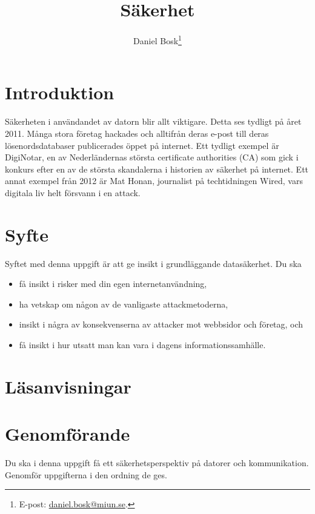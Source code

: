 \documentclass[11pt,a4paper]{miunasgn}
\title{Säkerhet}
\author{Daniel Bosk\footnote{%
	E-post: \href{mailto:daniel.bosk@miun.se}{daniel.bosk@miun.se}.
}}
\date{\svnId}
\begin{document}
\maketitle
\thispagestyle{foot}
\tableofcontents


\section{Introduktion}
\label{sec:Introduktion}
\noindent
Säkerheten i användandet av datorn blir allt viktigare.
Detta ses tydligt på året 2011.
Många stora företag hackades och alltifrån deras e-post till deras 
lösenordsdatabaser publicerades öppet på internet.
Ett tydligt exempel är DigiNotar, en av Nederländernas största certificate 
authorities (CA) som gick i konkurs efter en av de största skandalerna 
i historien av säkerhet på internet.
Ett annat exempel från 2012 är Mat Honan, journalist på techtidningen Wired, 
vars digitala liv helt försvann i en attack.


\section{Syfte}
\label{sec:Syfte}
\noindent
Syftet med denna uppgift är att ge insikt i grundläggande datasäkerhet.
Du ska
\begin{itemize}
	\item få insikt i risker med din egen internetanvändning,
	\item ha vetskap om någon av de vanligaste attackmetoderna,
	\item insikt i några av konsekvenserna av attacker mot webbsidor och
		företag, och
	\item få insikt i hur utsatt man kan vara i dagens informationssamhälle.
\end{itemize}


\section{Läsanvisningar}
\label{sec:Lasanvisningar}
\noindent



\section{Genomförande}
\label{sec:Genomforande}
\noindent
Du ska i denna uppgift få ett säkerhetsperspektiv på datorer och kommunikation.
Genomför uppgifterna i den ordning de ges.
\end{document}
